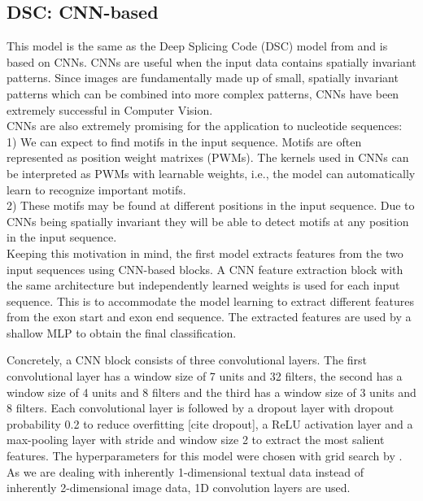 \subsection{DSC: CNN-based} \label{subsec:dsc}
This model is the same as the Deep Splicing Code (DSC) model from \cite{dsc} and is based on CNNs.
CNNs are useful when the input data contains spatially invariant patterns. Since images are fundamentally made up of small, spatially invariant patterns which can be combined into more complex patterns, CNNs have been extremely successful in Computer Vision.\\
CNNs are also extremely promising for the application to nucleotide sequences: \\
1) We can expect to find motifs in the input sequence. Motifs are often represented as position weight matrixes (PWMs). The kernels used in CNNs can be interpreted as PWMs with learnable weights, i.e., the model can automatically learn to recognize important motifs.\\
2) These motifs may be found at different positions in the input sequence. Due to CNNs being spatially invariant they will be able to detect motifs at any position in the input sequence. \\
Keeping this motivation in mind, the first model extracts features from the two input sequences using CNN-based blocks. A CNN feature extraction block with the same architecture but independently learned weights is used for each input sequence. This is to accommodate the model learning to extract different features from the exon start and exon end sequence. The extracted features are used by a shallow MLP to obtain the final classification. 

Concretely, a CNN block consists of three convolutional layers. The first convolutional layer has a window size of 7 units and 32 filters, the second has a window size of 4 units and 8 filters and the third has a window size of 3 units and 8 filters. Each convolutional layer is followed by a dropout layer with dropout probability 0.2 to reduce overfitting [cite dropout], a ReLU activation layer and a max-pooling layer with stride and window size 2 to extract the most salient features. The hyperparameters for this model were chosen with grid search by \cite{dsc}. As we are dealing with inherently 1-dimensional textual data instead of inherently 2-dimensional image data, 1D convolution layers are used.


